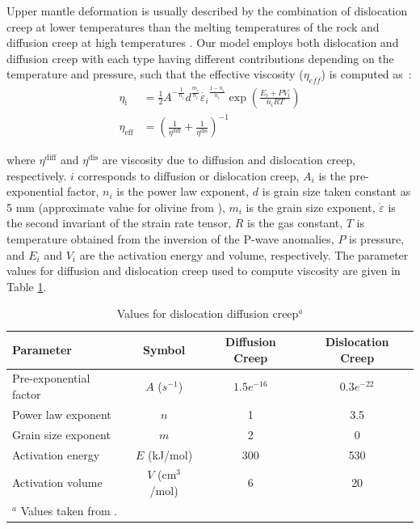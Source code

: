 \documentclass[draft,linenumbers]{agujournal2018}
\begin{document}
    Upper mantle deformation is usually described by the combination of dislocation creep at lower temperatures than the melting temperatures of the rock and diffusion creep at high temperatures \citep{gordon1967thermally}. Our model employs both dislocation and diffusion creep with each type having different contributions depending on the temperature and pressure, such that the effective viscosity ($\eta_{eff}$) is computed as~\citep{billen2007rheologic}:
%
\begin{align}
    \eta_{\text{i}} &= \frac{1}{2} A^{-\frac{1}{n_i}} d^\frac{m_i}{n_i} \dot{\varepsilon_i}^{\frac{1-n_i}{n_i}} \exp\left(\frac{E_i + PV_i}{n_iRT}\right) \\
    \eta_{\text{eff}} &= \left(\frac{1}{\eta^\text{diff}} + \frac{1}{\eta^\text{dis}}\right)^{-1}
\end{align}

where $\eta^\text{diff}$ and $\eta^\text{dis}$ are viscosity due to diffusion and dislocation creep, respectively. $i$ corresponds to diffusion or dislocation creep, $A_i$ is the pre-exponential factor, $n_i$ is the power law exponent, $d$ is grain size taken constant as 5 mm (approximate value for olivine from \citet{karato1984grain} ), $m_i$ is the grain size exponent, $\dot{\varepsilon}$ is the second invariant of the strain rate tensor, $R$ is the gas constant, $T$ is temperature obtained from the inversion of the P-wave anomalies, $P$ is pressure, and $E_i$ and $V_i$ are the activation energy and volume, respectively. The parameter values for diffusion and dislocation creep used to compute viscosity are given in Table \ref{table_model}.
%
\begin{table} \label{table_model}
    \caption{Values for dislocation diffusion creep$^a$}
    \centering
    \begin{tabular}{l c c c}
    \hline
     Parameter  & Symbol & Diffusion Creep & Dislocation Creep  \\
    \hline
      Pre-exponential factor & $A$ ($s^{-1}$) & $1.5e^{-16}$ & $0.3e^{-22}$   \\
      Power law exponent & $n$ & 1 & 3.5  \\
      Grain size exponent  & $m$ & 2 & 0   \\
      Activation energy  & $E$ (kJ/mol) & 300 & 530   \\
      Activation volume  & $V$ (cm$^3$/mol) & 6 & 20 \\
    \hline
    \multicolumn{2}{l}{$^{a}$ Values taken from \citet{karato1993rheology}.}
    \end{tabular}
\end{table}
\end{document}
